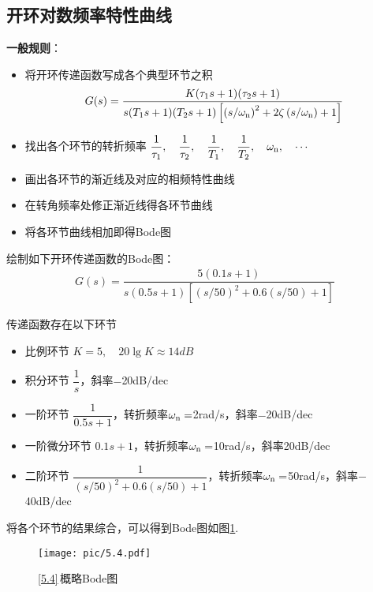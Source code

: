 \subsection{开环对数频率特性曲线}

\noindent \textbf{一般规则}：
\begin{itemize}
	\item 将开环传递函数写成各个典型环节之积
	\begin{align}
		G(s) = \dfrac{K (\tau_1 s + 1)(\tau_2 s + 1)}{s(T_1 s + 1)(T_2 s + 1)\left[\left(s/\omega_{\rm{n}}\right)^2 + 2 \zeta \left(s/\omega_{\rm{n}}\right) + 1\right]}
	\end{align}
	
	\item 找出各个环节的转折频率
		$\dfrac{1}{\tau_1}, \quad \dfrac{1}{\tau_2}, \quad \dfrac{1}{T_1}, \quad \dfrac{1}{T_2}, \quad \omega_{\rm{n}}, \quad \cdots $
	
	\item 画出各环节的渐近线及对应的相频特性曲线
	\item 在转角频率处修正渐近线得各环节曲线
	\item 将各环节曲线相加即得Bode图
\end{itemize}

\examples \label{5.4}绘制如下开环传递函数的Bode图：
\begin{align*}
	G(s) = \dfrac{5(0.1s + 1)}{s (0.5s + 1) \left[\left(s/50\right)^2 + 0.6 \left(s/50\right) + 1\right]}
\end{align*}

\solve 传递函数存在以下环节
\begin{itemize}
	\item 比例环节 \quad $K = 5, \quad 20\lg K \approx 14 dB$
	\item 积分环节 \quad $\dfrac{1}{s}$，斜率$-$20dB/dec
	\item 一阶环节 \quad $\dfrac{1}{0.5s + 1}$，转折频率$\omega_{{\rm{n}}} = $2rad/s，斜率$-$20dB/dec
	\item 一阶微分环节 \quad $0.1s + 1$，转折频率$\omega_{{\rm{n}}} = $10rad/s，斜率20dB/dec
	\item 二阶环节 \quad $\dfrac{1}{\left(s/50\right)^2 + 0.6 \left(s/50\right) + 1}$，转折频率$\omega_{{\rm{n}}} = $50rad/s，斜率$-$40dB/dec
\end{itemize}
将各个环节的结果综合，可以得到Bode图如图\ref{F5.4}.
\begin{figure}[!htb]
	\centering
	\texttt{[image: pic/5.4.pdf]}
	\caption{\ref{5.4}$\,$概略Bode图}
	\label{F5.4}
\end{figure}

